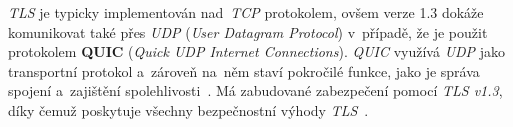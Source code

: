 \textit{TLS} je typicky implementován nad~\textit{TCP} protokolem, ovšem verze 1.3 dokáže komunikovat také přes \textit{UDP} (\textit{User Datagram Protocol}) v~případě, že je použit protokolem \textbf{QUIC} (\textit{Quick UDP Internet Connections}). \textit{QUIC} využívá \textit{UDP} jako transportní protokol a~zároveň na~něm staví pokročilé funkce, jako je správa spojení a~zajištění spolehlivosti~\cite{rfc-quic}. Má zabudované zabezpečení pomocí \textit{TLS v1.3}, díky čemuž poskytuje všechny bezpečnostní výhody \textit{TLS}~\cite{rfc-quic-tls}.
